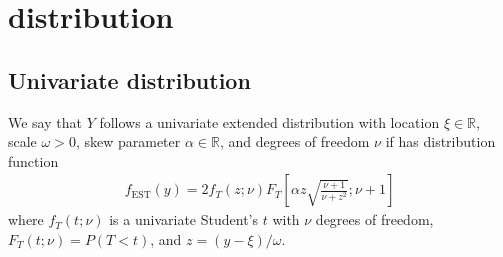 

\section{\Skewt{} distribution} \label{sta:skewt}

\subsection*{Univariate \skewt{} distribution}

We say that $Y$ follows a univariate extended \skewt{} distribution with location $\xi \in \mathbb{R}$, scale $\omega > 0$, skew parameter $\alpha \in \mathbb{R}$, and degrees of freedom $\nu$ if has distribution function
\begin{align}
  f_{\text{EST}}(y) = 2 f_T (z; \nu) F_T\left[ \alpha z \sqrt{ \frac{ \nu + 1 }{ \nu + z^2}}; \nu + 1 \right]
\end{align}
where $f_T(t; \nu)$ is a univariate Student's $t$ with $\nu$ degrees of freedom, $F_T(t; \nu) = P(T < t)$, and \hbox{$z = (y - \xi) / \omega$}.

